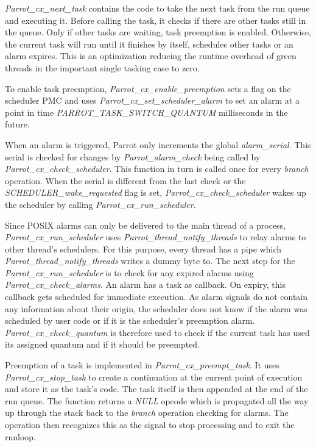 \documentclass[bachelor,english]{hgbthesis}
\begin{document}
\textit{Parrot\_cx\_next\_task} contains the code to take the next task from the run queue and executing it. Before calling the task, it checks if there are other tasks still in the queue. Only if other tasks are waiting, task preemption is enabled. Otherwise, the current task will run until it finishes by itself, schedules other tasks or an alarm expires. This is an optimization reducing the runtime overhead of green threads in the important single tasking case to zero.

To enable task preemption, \textit{Parrot\_cx\_enable\_preemption} sets a flag on the scheduler PMC and uses \textit{Parrot\_cx\_set\_scheduler\_alarm} to set an alarm at a point in time \textit{PARROT\_TASK\_SWITCH\_QUANTUM} milliseconds in the future.

When an alarm is triggered, Parrot only increments the global \textit{alarm\_serial}. This serial is checked for changes by \textit{Parrot\_alarm\_check} being called by \textit{Parrot\_cx\_check\_scheduler}. This function in turn is called once for every \textit{branch} operation. When the serial is different from the last check or the \textit{SCHEDULER\_wake\_requested} flag is set, \textit{Parrot\_cx\_check\_scheduler} wakes up the scheduler by calling \textit{Parrot\_cx\_run\_scheduler}.

Since POSIX alarms can only be delivered to the main thread of a process, \textit{Parrot\_cx\_run\_scheduler} uses \textit{Parrot\_thread\_notify\_threads} to relay alarms to other thread's schedulers. For this purpose, every thread has a pipe which \textit{Parrot\_thread\_notify\_threads} writes a dummy byte to. The next step for the \textit{Parrot\_cx\_run\_scheduler} is to check for any expired alarms using \textit{Parrot\_cx\_check\_alarms}. An alarm has a task as callback. On expiry, this callback gets scheduled for immediate execution. As alarm signals do not contain any information about their origin, the scheduler does not know if the alarm was scheduled by user code or if it is the scheduler's preemption alarm. \textit{Parrot\_cx\_check\_quantum} is therefore used to check if the current task has used its assigned quantum and if it should be preempted.

Preemption of a task is implemented in \textit{Parrot\_cx\_preempt\_task}. It uses \textit{Parrot\_cx\_stop\_task} to create a continuation at the current point of execution and store it as the task's code. The task itself is then appended at the end of the run queue. The function returns a \textit{NULL} opcode which is propagated all the way up through the stack back to the \textit{branch} operation checking for alarms. The operation then recognizes this as the signal to stop processing and to exit the runloop.
\end{document}
